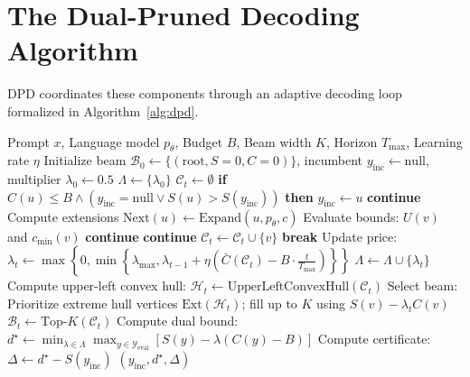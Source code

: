 \documentclass[11pt,a4paper]{article}
\theoremstyle{plain}
\theoremstyle{definition}
\theoremstyle{remark}
\begin{document}
\section{The Dual-Pruned Decoding Algorithm}

DPD coordinates these components through an adaptive decoding loop formalized in Algorithm~\ref{alg:dpd}.

\begin{algorithm}[t]
\caption{Dual-Pruned Decoding (DPD)}
\label{alg:dpd}
\begin{algorithmic}[1]
\Require Prompt $x$, Language model $p_\theta$, Budget $B$, Beam width $K$, Horizon $T_{\max}$, Learning rate $\eta$
\State Initialize beam $\mathcal{B}_0 \gets \{ (\text{root}, S=0, C=0) \}$, incumbent $y_{\text{inc}} \gets \text{null}$, multiplier $\lambda_0 \gets 0.5$
\State $\Lambda \gets \{\lambda_0\}$
    \State $\mathcal{C}_t \gets \emptyset$
            \State \textbf{if} $C(u) \le B \land (y_{\text{inc}} = \text{null} \lor S(u) > S(y_{\text{inc}}))$ \textbf{then} $y_{\text{inc}} \gets u$
            \State \textbf{continue}
        \EndIf
        \State Compute extensions $\text{Next}(u) \gets \text{Expand}(u, p_\theta, c)$
            \State Evaluate bounds: $U(v)$ and $c_{\min}(v)$
             \textbf{continue} 
            \EndIf
             \textbf{continue} 
            \EndIf
            \State $\mathcal{C}_t \gets \mathcal{C}_t \cup \{ v \}$
        \EndFor
    \EndFor
     \textbf{break} \EndIf
    \State Update price: $\lambda_t \gets \max\left\{0, \min\left\{\lambda_{\max}, \lambda_{t-1} + \eta \left(\bar{C}(\mathcal{C}_t) - B \cdot \frac{t}{T_{\max}}\right)\right\}\right\}$
    \State $\Lambda \gets \Lambda \cup \{\lambda_t\}$
    \State Compute upper-left convex hull: $\mathcal{H}_t \gets \text{UpperLeftConvexHull}(\mathcal{C}_t)$ 
    \State Select beam: Prioritize extreme hull vertices $\text{Ext}(\mathcal{H}_t)$; fill up to $K$ using $S(v) - \lambda_t C(v)$
    \State $\mathcal{B}_t \gets \text{Top-}K(\mathcal{C}_t)$
\EndFor
\State Compute dual bound: $d^\star \gets \min_{\lambda \in \Lambda} \max_{y \in \mathcal{Y}_{\text{eval}}} [S(y) - \lambda (C(y) - B)]$
\State Compute certificate: $\Delta \gets d^\star - S(y_{\text{inc}})$
\State \Return $(y_{\text{inc}}, d^\star, \Delta)$
\end{algorithmic}
\end{algorithm}
\end{document}
